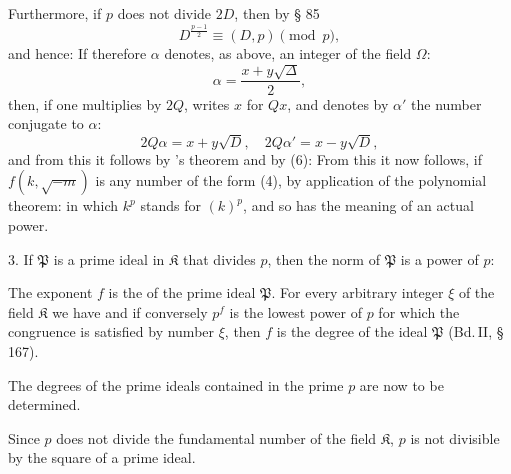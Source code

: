 
Furthermore, if $p$ does not divide $2D$, then by § 85
\[
D^{\frac{p-1}{2}} \equiv (D, p) \pmod{p},
\]
and hence:
If therefore $\alpha$ denotes, as above, an integer of the field $\Omega$:
\[
\alpha = \frac{x + y\sqrt{\Delta}}{2},
\]
then, if one multiplies by $2Q$, writes $x$ for $Qx$, and denotes by $\alpha'$ the number conjugate to $\alpha$:
\[
2Q\alpha = x + y\sqrt{D}, \quad 2Q\alpha' = x - y\sqrt{D},
\]
and from this it follows by 's theorem and by (6):
From this it now follows, if $f(k, \sqrt{-m})$ is any number of the form (4), by application of the polynomial theorem:
in which $k^p$ stands for $(k)^p$, and so has the meaning of an actual power.

3. If $\mathfrak{P}$ is a prime ideal in $\mathfrak{K}$ that divides $p$, then the norm of $\mathfrak{P}$ is a power of $p$:

The exponent $f$ is the  of the prime ideal $\mathfrak{P}$. For every arbitrary integer $\xi$ of the field $\mathfrak{K}$ we have
and if conversely $p^f$ is the lowest power of $p$ for which the congruence
is satisfied by  number $\xi$, then $f$ is the degree of the ideal $\mathfrak{P}$ (Bd.\,II, § 167).

The degrees of the prime ideals contained in the prime $p$ are now to be determined.

Since $p$ does not divide the fundamental number of the field $\mathfrak{K}$, $p$ is not divisible by the square of a prime ideal.
